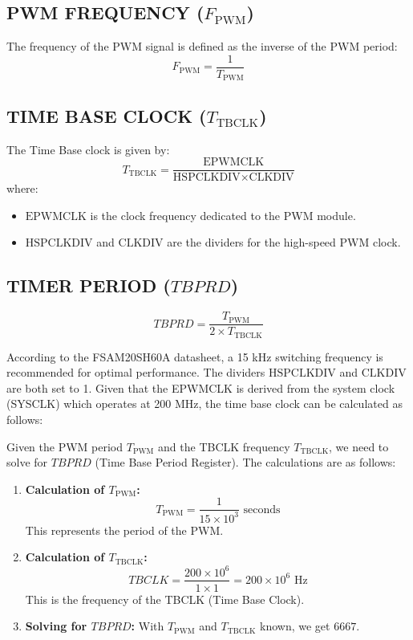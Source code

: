\subsection{PWM FREQUENCY (\( F_{\text{PWM}} \))}

The frequency of the PWM signal is defined as the inverse of the PWM period:
\begin{equation}
	F_{\text{PWM}} = \frac{1}{T_{\text{PWM}}}
\end{equation}

\subsection{TIME BASE CLOCK (\( T_{\text{TBCLK}} \))}

The Time Base clock is given by:
\begin{equation}
	T_{\text{TBCLK}} = \frac{\text{EPWMCLK}}{\text{HSPCLKDIV} \times \text{CLKDIV}}
\end{equation}
where:
\begin{itemize}
	\item \( \text{EPWMCLK} \) is the clock frequency dedicated to the PWM module.
	\item \( \text{HSPCLKDIV} \) and \( \text{CLKDIV} \) are the dividers for the high-speed PWM clock.
\end{itemize}

\subsection{TIMER PERIOD (\( TBPRD \))}

\begin{equation}
	TBPRD = \frac{T_{\text{PWM}}}{2 \times T_{\text{TBCLK}}}
\end{equation}

According to the FSAM20SH60A datasheet, a 15 kHz switching frequency is recommended for optimal performance. The dividers \( \text{HSPCLKDIV} \) and \( \text{CLKDIV} \) are both set to 1. Given that the EPWMCLK is derived from the system clock (SYSCLK) which operates at 200 MHz, the time base clock can be calculated as follows:

Given the PWM period \( T_{\text{PWM}} \) and the TBCLK frequency \( T_{\text{TBCLK}} \), we need to solve for \( TBPRD \) (Time Base Period Register). The calculations are as follows:

\begin{enumerate}
	\item \textbf{Calculation of \( T_{\text{PWM}} \):}
	      \[
		      T_{\text{PWM}} = \frac{1}{15 \times 10^3} \text{ seconds}
	      \]
	      This represents the period of the PWM.

	\item \textbf{Calculation of \( T_{\text{TBCLK}} \):}
	      \[
		      TBCLK = \frac{200 \times 10^6}{1 \times 1} = 200 \times 10^6 \text{ Hz}
	      \]
	      This is the frequency of the TBCLK (Time Base Clock).

	\item \textbf{Solving for \( TBPRD \):}
	      With \( T_{\text{PWM}} \) and \( T_{\text{TBCLK}} \) known, we get $6667$.
\end{enumerate}

